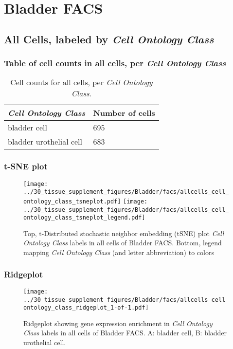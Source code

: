 \clearpage
\section{Bladder FACS}

\subsection{All Cells, labeled by \emph{Cell Ontology Class}}
\subsubsection{Table of cell counts in all cells, per \emph{Cell Ontology Class}}\begin{table}[h]
\centering
\label{my-label}
\begin{tabular}{@{}ll@{}}
\toprule

\emph{Cell Ontology Class}& Number of cells \\ \midrule
bladder cell & 695 \\

bladder urothelial cell & 683 \\
\bottomrule
\end{tabular}
\caption{Cell counts for all cells, per \emph{Cell Ontology Class}.}
\end{table}

\clearpage
\subsubsection{t-SNE plot}
\begin{figure}[h]
\centering
\texttt{[image: ../30\_tissue\_supplement\_figures/Bladder/facs/allcells\_cell\_ontology\_class\_tsneplot.pdf]}
\texttt{[image: ../30\_tissue\_supplement\_figures/Bladder/facs/allcells\_cell\_ontology\_class\_tsneplot\_legend.pdf]}
\caption{Top, t-Distributed stochastic neighbor embedding (tSNE) plot  \emph{Cell Ontology Class} labels in all cells of Bladder FACS. Bottom, legend mapping \emph{Cell Ontology Class} (and letter abbreviation) to colors}
\end{figure}


\clearpage

\subsubsection{Ridgeplot}
\begin{figure}[h]
\centering
\texttt{[image: ../30\_tissue\_supplement\_figures/Bladder/facs/allcells\_cell\_ontology\_class\_ridgeplot\_1-of-1.pdf]}

\caption{ Ridgeplot  showing gene expression enrichment in \emph{Cell Ontology Class} labels in all cells of Bladder FACS. A: bladder cell, B: bladder urothelial cell.}
\end{figure}


